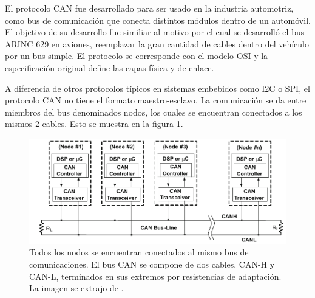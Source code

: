 



El protocolo CAN fue desarrollado para ser usado en la industria automotriz, como bus de comunicación que conecta distintos módulos dentro de un automóvil. El objetivo de su desarrollo fue similiar al motivo por el cual se desarrolló el bus ARINC 629 en aviones, reemplazar la gran cantidad de cables dentro del vehículo por un bus simple. El protocolo se corresponde con el modelo OSI y la especificación original define las capas física y de enlace.

A diferencia de otros protocolos típicos en sistemas embebidos como I2C o SPI, el protocolo CAN no tiene el formato maestro-esclavo. La comunicación se da entre miembros del bus denominados nodos, los cuales se encuentran conectados a los mismos 2 cables. Esto se muestra en la figura \ref{fig:red_CAN_2}. 

\begin{figure}[htb]
    \centering
    \includegraphics[width=\textwidth]{img/red_CAN.png}
    \caption{Todos los nodos se encuentran conectados al mismo bus de comunicaciones. El bus CAN se compone de dos cables, CAN-H y CAN-L, terminados en sus extremos por resistencias de adaptación. La imagen se extrajo de \cite{texasSLOA101B}.}
    \label{fig:red_CAN_2}
\end{figure}

